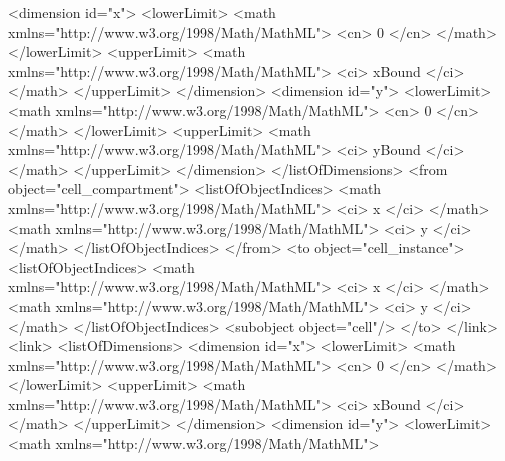 \documentclass{cekarticle}
\begin{document}
\begin{example}
                <dimension id="x">
                    <lowerLimit>
                        <math xmlns="http://www.w3.org/1998/Math/MathML">
                            <cn> 0 </cn>
                        </math>
                    </lowerLimit>
                    <upperLimit>
                        <math xmlns="http://www.w3.org/1998/Math/MathML">
                            <ci> xBound </ci>
                        </math>
                    </upperLimit>
                </dimension>
                <dimension id="y">
                    <lowerLimit>
                        <math xmlns="http://www.w3.org/1998/Math/MathML">
                            <cn> 0 </cn>
                        </math>
                    </lowerLimit>
                    <upperLimit>
                        <math xmlns="http://www.w3.org/1998/Math/MathML">
                            <ci> yBound </ci>
                        </math>
                    </upperLimit>
                </dimension>
            </listOfDimensions>
            <from object="cell_compartment">
                <listOfObjectIndices>
                    <math xmlns="http://www.w3.org/1998/Math/MathML">
                        <ci> x </ci>
                    </math>
                    <math xmlns="http://www.w3.org/1998/Math/MathML">
                        <ci> y </ci>            
                    </math>
                </listOfObjectIndices>
            </from>
            <to object="cell_instance">
                <listOfObjectIndices>
                    <math xmlns="http://www.w3.org/1998/Math/MathML">
                        <ci> x </ci>
                    </math>
                    <math xmlns="http://www.w3.org/1998/Math/MathML">
                        <ci> y </ci>            
                    </math>
                </listOfObjectIndices>
                <subobject object="cell"/>
            </to>
        </link>
        <link>
            <listOfDimensions>
                <dimension id="x">
                    <lowerLimit>
                        <math xmlns="http://www.w3.org/1998/Math/MathML">
                            <cn> 0 </cn>
                        </math>
                    </lowerLimit>
                    <upperLimit>
                        <math xmlns="http://www.w3.org/1998/Math/MathML">
                            <ci> xBound </ci>
                        </math>
                    </upperLimit>
                </dimension>
                <dimension id="y">
                    <lowerLimit>
                        <math xmlns="http://www.w3.org/1998/Math/MathML">

\end{example}
\end{document}
